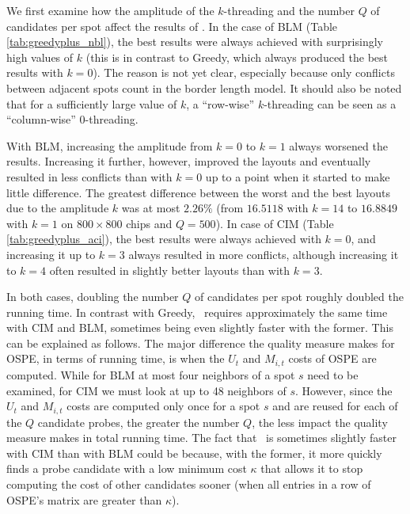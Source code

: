 We first examine how the amplitude of the $k$-threading and the number $Q$ of
candidates per spot affect the results of \Greedyplus. In the case of BLM (Table
\ref{tab:greedyplus_nbl}), the best results were always achieved with
surprisingly high values of $k$ (this is in contrast to Greedy, which always
produced the best results with $k=0$). The reason is not yet clear, especially
because only conflicts between adjacent spots count in the border length model.
It should also be noted that for a sufficiently large value of $k$, a
``row-wise'' $k$-threading can be seen as a ``column-wise'' 0-threading.

With BLM, increasing the amplitude from $k=0$ to $k=1$ always worsened the
results. Increasing it further, however, improved the layouts and eventually
resulted in less conflicts than with $k=0$ up to a point when it started to make
little difference. The greatest difference between the worst and the best
layouts due to the amplitude $k$ was at most $2.26\%$ (from $16.5118$ with
$k=14$ to $16.8849$ with $k=1$ on $800\times 800$ chips and $Q=500$). In case of
CIM (Table \ref{tab:greedyplus_aci}), the best results were always achieved with
$k=0$, and increasing it up to $k=3$ always resulted in more conflicts, although
increasing it to $k=4$ often resulted in slightly better layouts than with
$k=3$.

In both cases, doubling the number $Q$ of candidates per spot roughly doubled
the running time. In contrast with Greedy, \Greedyplus\ requires approximately
the same time with CIM and BLM, sometimes being even slightly faster with the
former. This can be explained as follows. The major difference the quality
measure makes for OSPE, in terms of running time, is when the $U_t$ and
$M_{i,t}$ costs of OSPE are computed. While for BLM at most four neighbors of a
spot $s$ need to be examined, for CIM we must look at up to 48 neighbors of $s$.
However, since the $U_t$ and $M_{i,t}$ costs are computed only once for a spot
$s$ and are reused for each of the $Q$ candidate probes, the greater the number
$Q$, the less impact the quality measure makes in total running time. The fact
that \Greedyplus\ is sometimes slightly faster with CIM than with BLM could be
because, with the former, it more quickly finds a probe candidate with a low
minimum cost $\kappa$ that allows it to stop computing the cost of other
candidates sooner (when all entries in a row of OSPE's matrix are greater than
$\kappa$).


